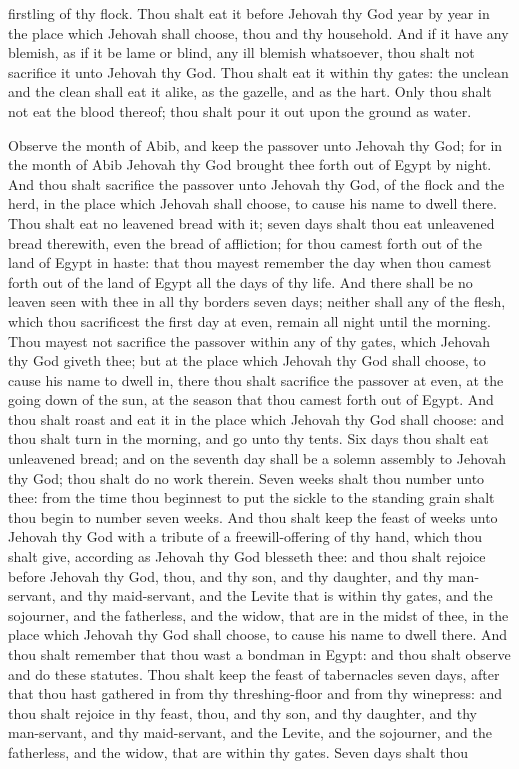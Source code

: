 firstling of thy flock. Thou shalt eat it before Jehovah thy God year by year in the place which Jehovah shall choose, thou and thy household. And if it have any blemish, as if it be lame or blind, any ill blemish whatsoever, thou shalt not sacrifice it unto Jehovah thy God. Thou shalt eat it within thy gates: the unclean and the clean shall eat it alike, as the gazelle, and as the hart. Only thou shalt not eat the blood thereof; thou shalt pour it out upon the ground as water. 

Observe the month of Abib, and keep the passover unto Jehovah thy God; for in the month of Abib Jehovah thy God brought thee forth out of Egypt by night. And thou shalt sacrifice the passover unto Jehovah thy God, of the flock and the herd, in the place which Jehovah shall choose, to cause his name to dwell there. Thou shalt eat no leavened bread with it; seven days shalt thou eat unleavened bread therewith, even the bread of affliction; for thou camest forth out of the land of Egypt in haste: that thou mayest remember the day when thou camest forth out of the land of Egypt all the days of thy life. And there shall be no leaven seen with thee in all thy borders seven days; neither shall any of the flesh, which thou sacrificest the first day at even, remain all night until the morning. Thou mayest not sacrifice the passover within any of thy gates, which Jehovah thy God giveth thee; but at the place which Jehovah thy God shall choose, to cause his name to dwell in, there thou shalt sacrifice the passover at even, at the going down of the sun, at the season that thou camest forth out of Egypt. And thou shalt roast and eat it in the place which Jehovah thy God shall choose: and thou shalt turn in the morning, and go unto thy tents. Six days thou shalt eat unleavened bread; and on the seventh day shall be a solemn assembly to Jehovah thy God; thou shalt do no work therein.  Seven weeks shalt thou number unto thee: from the time thou beginnest to put the sickle to the standing grain shalt thou begin to number seven weeks. And thou shalt keep the feast of weeks unto Jehovah thy God with a tribute of a freewill-offering of thy hand, which thou shalt give, according as Jehovah thy God blesseth thee: and thou shalt rejoice before Jehovah thy God, thou, and thy son, and thy daughter, and thy man-servant, and thy maid-servant, and the Levite that is within thy gates, and the sojourner, and the fatherless, and the widow, that are in the midst of thee, in the place which Jehovah thy God shall choose, to cause his name to dwell there. And thou shalt remember that thou wast a bondman in Egypt: and thou shalt observe and do these statutes.  Thou shalt keep the feast of tabernacles seven days, after that thou hast gathered in from thy threshing-floor and from thy winepress: and thou shalt rejoice in thy feast, thou, and thy son, and thy daughter, and thy man-servant, and thy maid-servant, and the Levite, and the sojourner, and the fatherless, and the widow, that are within thy gates. Seven days shalt thou 
